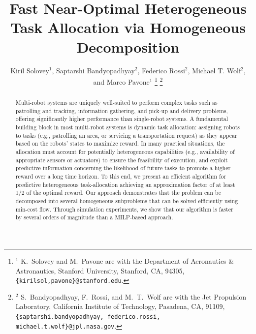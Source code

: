 \documentclass[conference]{IEEEtran}
\title{Fast Near-Optimal Heterogeneous Task Allocation via Homogeneous Decomposition}
\author{Kiril Solovey$^1$, Saptarshi Bandyopadhyay$^2$,  Federico Rossi$^2$, Michael T. Wolf$^2$, and Marco Pavone$^1$
\thanks{$^1$ K.\ Solovey and M.\ Pavone are with the Department of Aeronautics \& Astronautics, Stanford University, Stanford, CA, 94305, {\tt \{kirilsol,pavone\}@stanford.edu}.}
\thanks{$^2$ S.\ Bandyopadhyay, F.\ Rossi, and M.\ T.\ Wolf are with the Jet Propulsion Laboratory, California Institute of Technology, Pasadena, CA, 91109, {\tt \{saptarshi.bandyopadhyay, federico.rossi, michael.t.wolf\}@jpl.nasa.gov}.}}
\begin{document}
\maketitle

\begin{abstract}
Multi-robot systems are uniquely well-suited to perform complex tasks such as patrolling and tracking, information gathering, and pick-up and delivery problems, offering significantly higher performance than single-robot systems. A fundamental building block in most multi-robot systems is dynamic task allocation: assigning robots to tasks (e.g., patrolling an area, or servicing a transportation request) as they appear based on the robots' states to maximize reward. In many practical situations, the allocation must account for potentially heterogeneous capabilities (e.g., availability of appropriate sensors or actuators) to ensure the feasibility of execution, and exploit predictive information concerning the likelihood of future tasks to promote a higher reward over a long time horizon. To this end, we present an efficient algorithm for predictive heterogeneous task-allocation achieving an approximation factor of at least 1/2 of the optimal reward. Our approach demonstrates that the problem can be decomposed into several homogeneous subproblems that can be solved efficiently using min-cost flow. Through simulation experiments, we show that our algorithm is faster by several orders of magnitude than a MILP-based approach.
\end{abstract}
\end{document}
